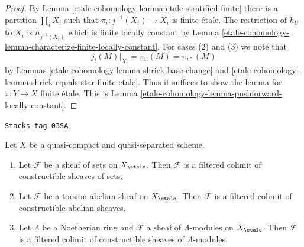 \begin{proof}
By Lemma \ref{etale-cohomology-lemma-etale-stratified-finite} there is a partition
$\coprod_i X_i$ such that $\pi_i : j^{-1}(X_i) \to X_i$ is finite \'etale.
The restriction of $h_U$ to $X_i$ is $h_{j^{-1}(X_i)}$ which is finite
locally constant by Lemma \ref{etale-cohomology-lemma-characterize-finite-locally-constant}.
For cases (2) and (3) we note that
$$
j_!(\underline{M})|_{X_i} =
\pi_{i!}(\underline{M}) =
\pi_{i*}(\underline{M})
$$
by Lemmas \ref{etale-cohomology-lemma-shriek-base-change} and
\ref{etale-cohomology-lemma-shriek-equals-star-finite-etale}.
Thus it suffices to show the lemma for $\pi : Y \to X$ finite \'etale.
This is Lemma \ref{etale-cohomology-lemma-pushforward-locally-constant}.
\end{proof}

\begin{lemma}
\label{etale-cohomology-lemma-torsion-colimit-constructible}
\href{https://stacks.math.columbia.edu/tag/03SA}{\texttt{Stacks tag 03SA}}

Let $X$ be a quasi-compact and quasi-separated scheme.
\begin{enumerate}
\item Let $\mathcal{F}$ be a sheaf of sets on $X_\etale$.
Then $\mathcal{F}$ is a filtered colimit of constructible
sheaves of sets.
\item Let $\mathcal{F}$ be a torsion abelian sheaf on $X_\etale$.
Then $\mathcal{F}$ is a filtered colimit of constructible abelian sheaves.
\item Let $\Lambda$ be a Noetherian ring and $\mathcal{F}$ a sheaf
of $\Lambda$-modules on $X_\etale$. Then
$\mathcal{F}$ is a filtered colimit of constructible sheaves of
$\Lambda$-modules.
\end{enumerate}
\end{lemma}

